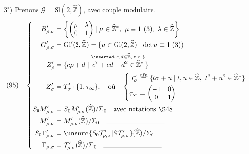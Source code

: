 
$3^\circ)$ Prenons $\mathcal G=\mathrm{Sl}(2,\widehat{\mathbb Z})$, avec couple modulaire.
\[
(95)\quad\left\{\begin{aligned}
B'_{\rho,\sigma}&=
\left\{\begin{pmatrix}\mu&\lambda\\0&1\end{pmatrix}\mid
\mu\in\widehat{\mathbb Z}^{*},\ \mu\equiv1\ (3),\ \lambda\in\widehat{\mathbb Z}\right\}\\
G'_{\rho,\sigma}&=\mathrm{Gl}'(2,\widehat{\mathbb Z})
=\{u\in\mathrm{Gl}(2,\widehat{\mathbb Z})\mid\det u\equiv1\ (3))\\
Z'_\rho&=\{c\rho+d\mid
\overset{\inserted{c,d\in\widehat{\mathbb Z},\ \text{t.q.}}}{c^2+cd+d^2\in\widehat{\mathbb Z}^{*}}\}\\
Z'_\sigma&=T'_\sigma\cdot\{1,\tau_\infty\},\quad\text{où}\quad
\left\{\begin{aligned}
T'_\sigma&\overset{\mathrm{dfn}}=
\{t\sigma+u\mid t,u\in\widehat{\mathbb Z},\ t^2+u^2\in\widehat{\mathbb Z}^{*}\}\\
\tau_\infty&=\begin{pmatrix}-1&0\\0&1\end{pmatrix}
\end{aligned}\right.\\
S_0M'_{\rho,\sigma}&=S_0M'_{\rho,\sigma}(\widehat{\mathbb Z})/\Sigma_0\quad\text{avec notations \S48}\\
M'_{\rho,\sigma}&=M'_{\rho,\sigma}(\widehat{\mathbb Z})/\Sigma_0\quad\rule{3cm}{0.3pt}\\
S_0\Gamma'_{\rho,\sigma}&=\unsure{S_0\mathcal T'_{\rho,\sigma}|S\mathcal T'_{\rho,\sigma}}(\widehat{\mathbb Z})/\Sigma_0\quad\rule{3cm}{0.3pt}\\
\Gamma_{\rho,\sigma}&=\mathcal T'_{\rho,\sigma}(\widehat{\mathbb Z})/\Sigma_0\quad\rule{3cm}{0.3pt}
\end{aligned}\right.
\]

